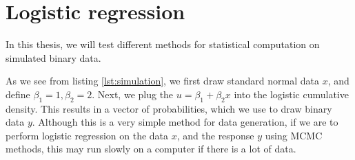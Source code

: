 \section{Logistic regression}\label{subsec:data}
In this thesis, we will test different methods for statistical computation on simulated binary data. 

As we see from listing \ref{lst:simulation}, we first draw standard normal data $x$, and define $\beta_1 = 1, \beta_2 = 2$. Next, we plug the  $u = \beta_1 + \beta_2 x$ into the logistic cumulative density. 
This results in a vector of probabilities, which we use to draw binary data $y$. Although this is a very simple method for data generation, if we are to perform logistic regression on the data $x$, and the response $y$ using MCMC methods, this may run slowly on a computer if there is a lot of data.


